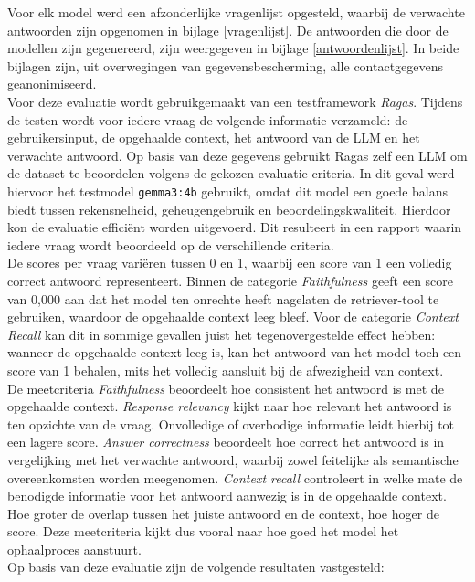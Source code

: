 Voor elk model werd een afzonderlijke vragenlijst opgesteld, waarbij de verwachte antwoorden zijn opgenomen in bijlage \ref{vragenlijst}.
De antwoorden die door de modellen zijn gegenereerd, zijn weergegeven in bijlage \ref{antwoordenlijst}.
In beide bijlagen zijn, uit overwegingen van gegevensbescherming, alle contactgegevens geanonimiseerd.
\\[1em]
Voor deze evaluatie wordt gebruikgemaakt van een testframework \textit{Ragas}. Tijdens de testen wordt voor iedere vraag de volgende informatie verzameld: de gebruikersinput, de opgehaalde context, het antwoord van de LLM en het verwachte antwoord. Op basis van deze gegevens gebruikt Ragas zelf een LLM om de dataset te beoordelen volgens de gekozen evaluatie criteria. In dit geval werd hiervoor het testmodel \texttt{gemma3:4b} gebruikt, omdat dit model een goede balans biedt tussen rekensnelheid, geheugengebruik en beoordelingskwaliteit. Hierdoor kon de evaluatie efficiënt worden uitgevoerd. Dit resulteert in een rapport waarin iedere vraag wordt beoordeeld op de verschillende criteria.
\\[1em]
De scores per vraag variëren tussen 0 en 1, waarbij een score van 1 een volledig correct antwoord representeert.
Binnen de categorie \textit{Faithfulness} geeft een score van 0{,}000 aan dat het model ten onrechte heeft nagelaten de retriever-tool te gebruiken, waardoor de opgehaalde context leeg bleef.
Voor de categorie \textit{Context Recall} kan dit in sommige gevallen juist het tegenovergestelde effect hebben: wanneer de opgehaalde context leeg is, kan het antwoord van het model toch een score van 1 behalen, mits het volledig aansluit bij de afwezigheid van context.
\\[1em]
De meetcriteria \textit{Faithfulness} beoordeelt hoe consistent het antwoord is met de opgehaalde context. \textit{Response relevancy} kijkt naar hoe relevant het antwoord is ten opzichte van de vraag. Onvolledige of overbodige informatie leidt hierbij tot een lagere score. \textit{Answer correctness} beoordeelt hoe correct het antwoord is in vergelijking met het verwachte antwoord, waarbij zowel feitelijke als semantische overeenkomsten worden meegenomen. \textit{Context recall} controleert in welke mate de benodigde informatie voor het antwoord aanwezig is in de opgehaalde context. Hoe groter de overlap tussen het juiste antwoord en de context, hoe hoger de score. Deze meetcriteria kijkt dus vooral naar hoe goed het model het ophaalproces aanstuurt.
\\[1em]
Op basis van deze evaluatie zijn de volgende resultaten vastgesteld:
